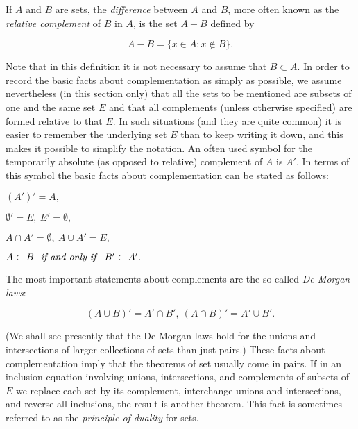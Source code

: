 
If $A$ and $B$ are sets, the \textit{difference} between $A$ and $B$, more often known as the \textit{relative complement} of $B$ in $A$, is the set $A - B$ defined by 

\begin{equation*}
A - B = \{ x \in A: x \notin B \}.
\end{equation*}

Note that in this definition it is not necessary to assume that $B \subset A$. In order to record the basic facts about complementation as simply as possible, we assume nevertheless (in this section only) that all the sets to be mentioned are subsets of one and the same set $E$ and that all complements (unless otherwise specified) are formed relative to that $E$. In such situations (and they are quite common) it is easier to remember the underlying set $E$ than to keep writing it down, and this makes it possible to simplify the notation. An often used symbol for the temporarily absolute (as opposed to relative) complement of $A$ is $A'$. In terms of this symbol the basic facts about complementation can be stated as follows:

\begin{center}
$(A')' = A,$

$\emptyset ' = E, \: E' = \emptyset ,$

$ A \cap A' = \emptyset, \: A \cup A' = E,$

$A \subset B \text{ \textit{ if and only if } } B' \subset A'.$
\end{center}

The most important statements about complements are the so-called \textit{De Morgan laws}:

\begin{equation*}
(A \cup B)' = A' \cap B', \: (A \cap B)' = A' \cup B'.
\end{equation*}

(We shall see presently that the De Morgan laws hold for the unions and intersections of larger collections of sets than just pairs.) These facts about complementation imply that the theorems of set usually come in pairs. If in an inclusion equation involving unions, intersections, and complements of subsets of $E$ we replace each set by its complement, interchange unions and intersections, and reverse all  inclusions, the result is another theorem. This fact is sometimes referred to as the \textit{principle of duality} for sets.

